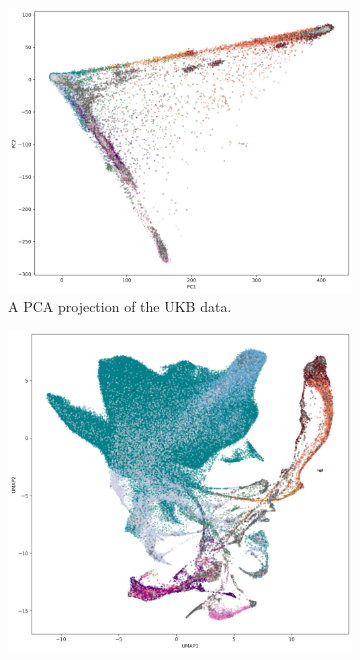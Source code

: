 \documentclass[12pt]{article}
\begin{document}
\begin{figure}[h!]
  \centering
  \begin{subfigure}[b]{0.49\linewidth}
    \includegraphics[width=\linewidth]{code/ukb/images/ukbb_pca_coords_eth.png}
    \caption{A PCA projection of the UKB data.}
    \label{fig:UKB_PCA}
  \end{subfigure}
  \begin{subfigure}[b]{0.49\linewidth}
    \includegraphics[width=\linewidth]{code/ukb/images/UKBB_UMAP_PC20_NC2_NN15_MD05_2018454111_eth.png}

\end{subfigure}
\end{figure}
\end{document}
